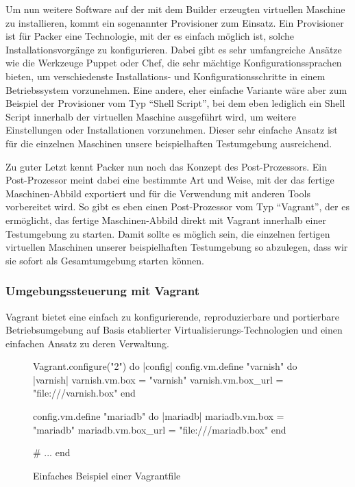 Um nun weitere Software auf der mit dem Builder erzeugten virtuellen Maschine zu installieren, kommt ein sogenannter Provisioner zum Einsatz. Ein Provisioner ist für Packer eine Technologie, mit der es einfach möglich ist, solche Installationsvorgänge zu konfigurieren. Dabei gibt es sehr umfangreiche Ansätze wie die Werkzeuge Puppet oder Chef, die sehr mächtige Konfigurationssprachen bieten, um verschiedenste Installations- und Konfigurationsschritte in einem Betriebssystem vorzunehmen. Eine andere, eher einfache Variante wäre aber zum Beispiel der Provisioner vom Typ "`Shell Script"', bei dem eben lediglich ein Shell Script innerhalb der virtuellen Maschine ausgeführt wird, um weitere Einstellungen oder Installationen vorzunehmen. Dieser sehr einfache Ansatz ist für die einzelnen Maschinen unsere beispielhaften Testumgebung ausreichend.

Zu guter Letzt kennt Packer nun noch das Konzept des Post-Prozessors. Ein Post-Prozessor meint dabei eine bestimmte Art und Weise, mit der das fertige Maschinen-Abbild exportiert und für die Verwendung mit anderen Tools vorbereitet wird. So gibt es eben einen Post-Prozessor vom Typ "`Vagrant"', der es ermöglicht, das fertige Maschinen-Abbild direkt mit Vagrant innerhalb einer Testumgebung zu starten. Damit sollte es möglich sein, die einzelnen fertigen virtuellen Maschinen unserer beispielhaften Testumgebung so abzulegen, dass wir sie sofort als Gesamtumgebung starten können.

\subsubsection{Umgebungssteuerung mit Vagrant}

Vagrant bietet eine einfach zu konfigurierende, reproduzierbare und portierbare Betriebsumgebung auf Basis etablierter Virtualisierungs-Technologien und einen einfachen Ansatz zu deren Verwaltung.

\begin{figure}[!ht]
  \begin{center}
    \begin{rubycode}
Vagrant.configure("2") do |config|
  config.vm.define "varnish" do |varnish|
    varnish.vm.box = "varnish"
    varnish.vm.box_url = "file:///varnish.box"
  end

  config.vm.define "mariadb" do |mariadb|
    mariadb.vm.box = "mariadb"
    mariadb.vm.box_url = "file:///mariadb.box"
  end

  # ...
end
    \end{rubycode}
    \caption{Einfaches Beispiel einer Vagrantfile}
  \end{center}
\end{figure}

